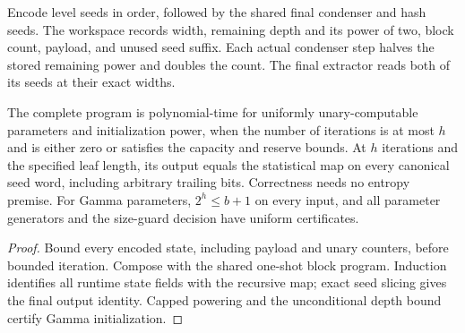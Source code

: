 \begin{definition}
  \label{def:lowerbounds-algebraic-near-halving-program}
  \leanok
  Encode level seeds in order, followed by the shared final condenser and
  hash seeds. The workspace records width, remaining depth and its power
  of two, block count, payload, and unused seed suffix. Each actual
  condenser step halves the stored remaining power and doubles the count.
  The final extractor reads both of its seeds at their exact widths.
\end{definition}

\begin{theorem}
  \label{thm:lowerbounds-algebraic-near-halving-program}
  \leanok
  The complete program is polynomial-time for uniformly unary-computable
  parameters and initialization power, when the number of iterations is at
  most $h$ and is either zero or satisfies the capacity and reserve bounds.
  At $h$ iterations and the specified leaf length, its output equals the
  statistical map on every canonical seed word, including arbitrary
  trailing bits. Correctness needs no entropy premise.
  For Gamma parameters, $2^h\le b+1$ on every input, and all parameter
  generators and the size-guard decision have uniform certificates.
\end{theorem}
\begin{proof}
  \leanok
  Bound every encoded state, including payload and unary counters, before
  bounded iteration. Compose with the shared one-shot block program.
  Induction identifies all runtime state fields with the recursive map;
  exact seed slicing gives the final output identity. Capped powering and
  the unconditional depth bound certify Gamma initialization.
\end{proof}

